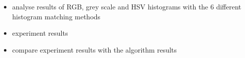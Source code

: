 \begin{itemize}
    \item analyse results of RGB, grey scale and HSV histograms with the 6 different histogram matching methods
    \item experiment results
    \item compare experiment results with the algorithm results
\end{itemize}